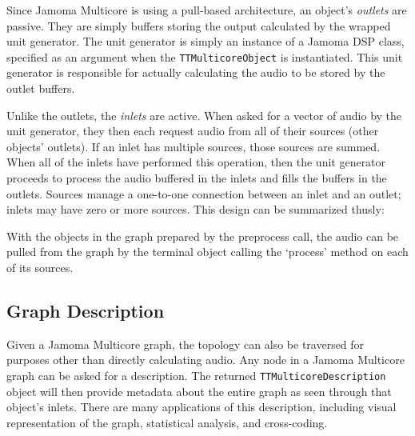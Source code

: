 \documentclass[twoside,a4paper]{article}
\begin{document}
Since Jamoma Multicore is using a pull-based architecture, an object's \emph{outlets} are passive.  They are simply buffers storing the output calculated by the wrapped unit generator.  The unit generator is simply an instance of a Jamoma DSP class, specified as an argument when the \texttt{TTMulticoreObject} is instantiated.  This unit generator is responsible for actually calculating the audio to be stored by the outlet buffers.

Unlike the outlets, the \emph{inlets} are active.  When asked for a vector of audio by the unit generator, they then each request audio from all of their sources (other objects' outlets).  If an inlet has multiple sources, those sources are summed.  When all of the inlets have performed this operation, then the unit generator proceeds to process the audio buffered in the inlets and fills the buffers in the outlets.  Sources manage a one-to-one connection between an inlet and an outlet; inlets may have zero or more sources.  This design can be summarized thusly:

With the objects in the graph prepared by the preprocess call, the audio can be pulled from the graph by the terminal object calling the `process' method on each of its sources.





\subsection{Graph Description} %

Given a Jamoma Multicore graph, the topology can also be traversed for purposes other than directly calculating audio.  
Any node in a Jamoma Multicore graph can be asked for a description.  The returned \texttt{TTMulticoreDescription} object will then provide 
metadata about the entire graph as seen through that object's inlets.  
There are many applications of this description, including visual representation of the graph, statistical analysis, and cross-coding.
\end{document}
